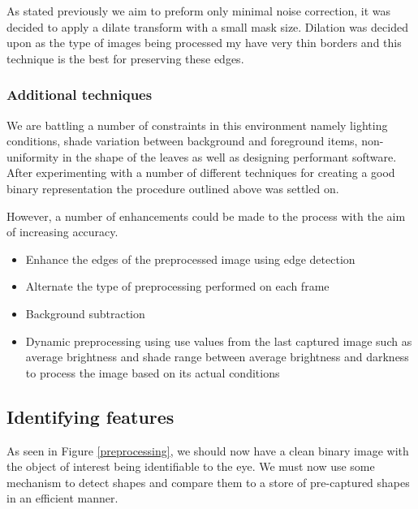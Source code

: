 As stated previously we aim to preform only minimal noise correction, it was decided to apply a dilate transform with a small mask size. Dilation was decided upon as the type of images being processed my have very thin borders and this technique is the best for preserving these edges.




\subsubsection{Additional techniques}
We are battling a number of constraints in this environment namely lighting conditions, shade variation between background and foreground items, non-uniformity in the shape of the leaves as well as designing performant software. After experimenting with a number of different techniques for creating a good binary representation the procedure outlined above was settled on.

However, a number of enhancements could be made to the process with the aim of increasing accuracy. 

\begin{itemize}
\item Enhance the edges of the preprocessed image using edge detection
\item Alternate the type of preprocessing performed on each frame
\item Background subtraction
\item Dynamic preprocessing using use values from the last captured image such as average brightness and shade range between average brightness and darkness to process the image based on its actual conditions
\end{itemize}


\subsection{Identifying features}

As seen in Figure \ref{preprocessing}, we should now have a clean binary image with the object of interest being identifiable to the eye. We must now use some mechanism to detect shapes and compare them to a store of pre-captured shapes in an efficient manner. 


